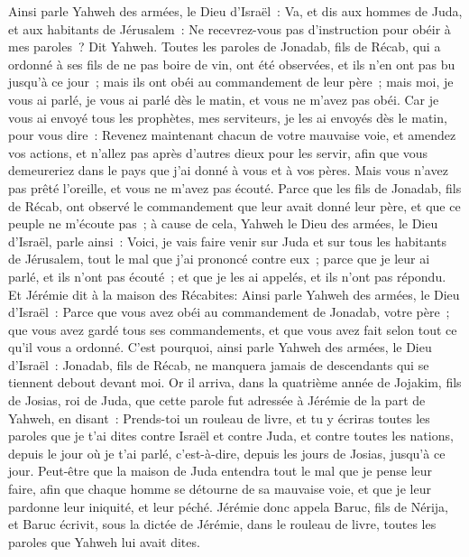 \begin{multicols}{2}
Ainsi parle Yahweh des armées, le Dieu d'Israël~: Va, et dis aux hommes de Juda, et aux habitants de Jérusalem~: Ne recevrez-vous pas d'instruction pour obéir à mes paroles~? Dit Yahweh.
Toutes les paroles de Jonadab, fils de Récab, qui a ordonné à ses fils de ne pas boire de vin, ont été observées, et ils n'en ont pas bu jusqu'à ce jour~; mais ils ont obéi au commandement de leur père~; mais moi, je vous ai parlé, je vous ai parlé dès le matin, et vous ne m'avez pas obéi.
Car je vous ai envoyé tous les prophètes, mes serviteurs, je les ai envoyés dès le matin, pour vous dire~: Revenez maintenant chacun de votre mauvaise voie, et amendez vos actions, et n'allez pas après d'autres dieux pour les servir, afin que vous demeureriez dans le pays que j'ai donné à vous et à vos pères. Mais vous n'avez pas prêté l'oreille, et vous ne m'avez pas écouté.
Parce que les fils de Jonadab, fils de Récab, ont observé le commandement que leur avait donné leur père, et que ce peuple ne m'écoute pas~;
à cause de cela, Yahweh le Dieu des armées, le Dieu d'Israël, parle ainsi~: Voici, je vais faire venir sur Juda et sur tous les habitants de Jérusalem, tout le mal que j'ai prononcé contre eux~; parce que je leur ai parlé, et ils n'ont pas écouté~; et que je les ai appelés, et ils n'ont pas répondu.
Et Jérémie dit à la maison des Récabites: Ainsi parle Yahweh des armées, le Dieu d'Israël~: Parce que vous avez obéi au commandement de Jonadab, votre père~; que vous avez gardé tous ses commandements, et que vous avez fait selon tout ce qu'il vous a ordonné.
C'est pourquoi, ainsi parle Yahweh des armées, le Dieu d'Israël~: Jonadab, fils de Récab, ne manquera jamais de descendants qui se tiennent debout devant moi.
\VerseOne{}Or il arriva, dans la quatrième année de Jojakim, fils de Josias, roi de Juda, que cette parole fut adressée à Jérémie de la part de Yahweh, en disant~:
Prends-toi un rouleau de livre, et tu y écriras toutes les paroles que je t'ai dites contre Israël et contre Juda, et contre toutes les nations, depuis le jour où je t'ai parlé, c'est-à-dire, depuis les jours de Josias, jusqu'à ce jour.
Peut-être que la maison de Juda entendra tout le mal que je pense leur faire, afin que chaque homme se détourne de sa mauvaise voie, et que je leur pardonne leur iniquité, et leur péché.
Jérémie donc appela Baruc, fils de Nérija, et Baruc écrivit, sous la dictée de Jérémie, dans le rouleau de livre, toutes les paroles que Yahweh lui avait dites.

\end{multicols}
